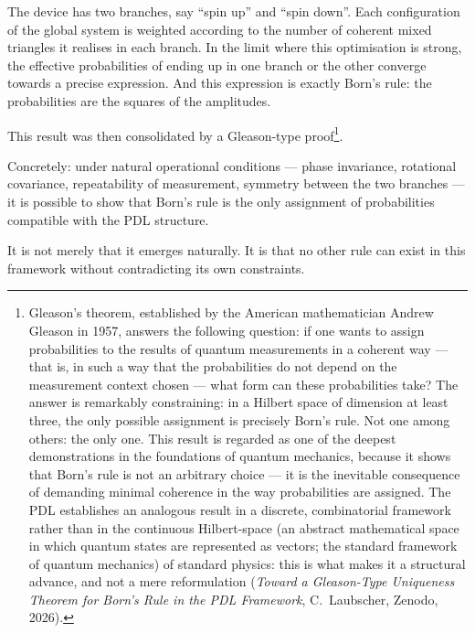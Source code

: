 \documentclass[11pt, a4paper, openright]{book}
\begin{document}
\medskip

The device has two branches, say “spin up” and “spin down”. Each configuration of the global system is weighted according to the number of coherent mixed triangles it realises in each branch. In the limit where this optimisation is strong, the effective probabilities of ending up in one branch or the other converge towards a precise expression. And this expression is exactly Born’s rule: the probabilities are the squares of the amplitudes.

\medskip

This result was then consolidated by a Gleason-type proof\footnote{%
  Gleason’s theorem, established by the American mathematician Andrew Gleason in 1957, answers the following question: if one wants to assign probabilities to the results of quantum measurements in a coherent way — that is, in such a way that the probabilities do not depend on the measurement context chosen — what form can these probabilities take? The answer is remarkably constraining: in a Hilbert space of dimension at least three, the only possible assignment is precisely Born’s rule. Not one among others: the only one. This result is regarded as one of the deepest demonstrations in the foundations of quantum mechanics, because it shows that Born’s rule is not an arbitrary choice — it is the inevitable consequence of demanding minimal coherence in the way probabilities are assigned. The PDL establishes an analogous result in a discrete, combinatorial framework rather than in the continuous Hilbert-space (an abstract mathematical space in which quantum states are represented as vectors; the standard framework of quantum mechanics) of standard physics: this is what makes it a structural advance, and not a mere reformulation (\textit{Toward a Gleason-Type Uniqueness Theorem for Born's Rule in the PDL Framework}, C.~Laubscher, Zenodo, 2026).}.

\medskip

Concretely: under natural operational conditions —
phase invariance, rotational covariance, repeatability of measurement,
symmetry between the two branches — it is possible to show that Born’s rule
is the only assignment of probabilities compatible with the PDL structure.

\medskip

It is not merely that it emerges naturally. It is that no other
rule can exist in this framework without contradicting its own constraints.

\medskip
\end{document}
